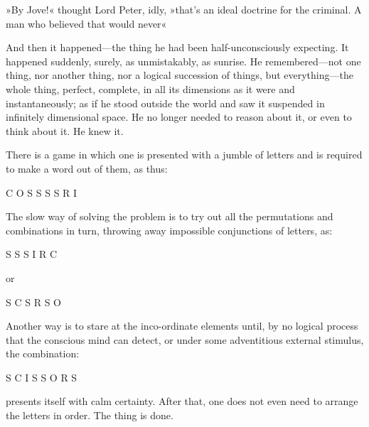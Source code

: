 »By Jove!« thought Lord Peter, idly, »that's an ideal doctrine for the criminal. A man who believed that would never\longdash«

And then it happened\allowbreak---\allowbreak the thing he had been half-unconsciously expecting. It happened suddenly, surely, as unmistakably, as sunrise. He remembered\allowbreak---\allowbreak not one thing, nor another thing, nor a logical succession of things, but everything\allowbreak---\allowbreak the whole thing, perfect, complete, in all its dimensions as it were and instantaneously; as if he stood outside the world and saw it suspended in infinitely dimensional space. He no longer needed to reason about it, or even to think about it. He knew it.

There is a game in which one is presented with a jumble of letters and is required to make a word out of them, as thus:

\begin{center}
\textsc{C O S S S S R I}
\end{center}

The slow way of solving the problem is to try out all the permutations and combinations in turn, throwing away impossible conjunctions of letters, as:

\begin{center}
\textsc{S S S I R C}
\end{center}

or

\begin{center}
\textsc{S C S R S O}
\end{center}

Another way is to stare at the inco-ordinate elements until, by no logical process that the conscious mind can detect, or under some adventitious external stimulus, the combination:

\begin{center}
\textsc{S C I S S O R S}
\end{center}

presents itself with calm certainty. After that, one does not even need to arrange the letters in order. The thing is done.

